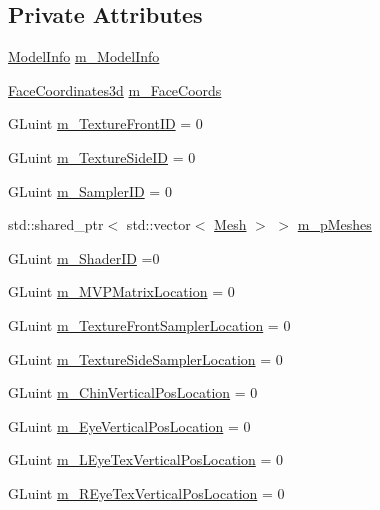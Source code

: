 \subsection*{Private Attributes}
\begin{DoxyCompactItemize}
\item 
\hyperlink{struct_face3_d_1_1_model_1_1_model_info}{Model\+Info} \hyperlink{class_face3_d_1_1_model_a4e781e1061417cad95eb99640fc4f77b}{m\+\_\+\+Model\+Info}
\item 
\hyperlink{class_face3_d_1_1_face_coordinates3d}{Face\+Coordinates3d} \hyperlink{class_face3_d_1_1_model_a340fc99b4793025ab7775c6242dcfda7}{m\+\_\+\+Face\+Coords}
\item 
G\+Luint \hyperlink{class_face3_d_1_1_model_adf4a54487670014da5422dc36940a332}{m\+\_\+\+Texture\+Front\+ID} = 0
\item 
G\+Luint \hyperlink{class_face3_d_1_1_model_a6bd8337f56d992cc16d26ae1b6af4c21}{m\+\_\+\+Texture\+Side\+ID} = 0
\item 
G\+Luint \hyperlink{class_face3_d_1_1_model_a7e658ebb2162121ee78586ae1435f37a}{m\+\_\+\+Sampler\+ID} = 0
\item 
std\+::shared\+\_\+ptr$<$ std\+::vector$<$ \hyperlink{class_face3_d_1_1_mesh}{Mesh} $>$ $>$ \hyperlink{class_face3_d_1_1_model_a8e66abbba8d896017fe33c247036f133}{m\+\_\+p\+Meshes}
\item 
G\+Luint \hyperlink{class_face3_d_1_1_model_afbe10fef4fd5836080b32f75519bafe1}{m\+\_\+\+Shader\+ID} =0
\item 
G\+Luint \hyperlink{class_face3_d_1_1_model_af342a14a7054f45b1077e7eea5dc892b}{m\+\_\+\+M\+V\+P\+Matrix\+Location} = 0
\item 
G\+Luint \hyperlink{class_face3_d_1_1_model_a327fa317ef7aeb53d98a11c98325ca8c}{m\+\_\+\+Texture\+Front\+Sampler\+Location} = 0
\item 
G\+Luint \hyperlink{class_face3_d_1_1_model_a206d2e11c046acd3bbbb8a6ce8aa4586}{m\+\_\+\+Texture\+Side\+Sampler\+Location} = 0
\item 
G\+Luint \hyperlink{class_face3_d_1_1_model_a6b5d007981b8b32ea025de8b9a6111eb}{m\+\_\+\+Chin\+Vertical\+Pos\+Location} = 0
\item 
G\+Luint \hyperlink{class_face3_d_1_1_model_ac6c2485555e2ed5b92ef69f17e0beeb6}{m\+\_\+\+Eye\+Vertical\+Pos\+Location} = 0
\item 
G\+Luint \hyperlink{class_face3_d_1_1_model_a87378c96c0bf29bbf4f4615461498a18}{m\+\_\+\+L\+Eye\+Tex\+Vertical\+Pos\+Location} = 0
\item 
G\+Luint \hyperlink{class_face3_d_1_1_model_a79e5b9a3c19a532ad34debe76ccea406}{m\+\_\+\+R\+Eye\+Tex\+Vertical\+Pos\+Location} = 0

\end{DoxyCompactItemize}

